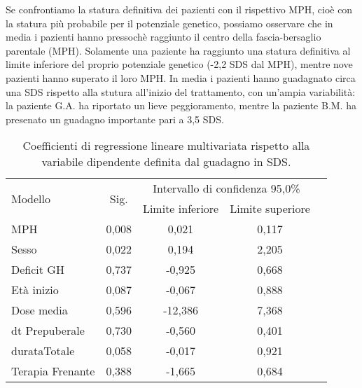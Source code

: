 Se confrontiamo la statura definitiva dei pazienti con il rispettivo MPH, cioè con la statura più probabile per il potenziale genetico, possiamo osservare che in media i pazienti hanno pressochè raggiunto il centro della fascia-bersaglio parentale (MPH). Solamente una paziente ha raggiunto una statura definitiva al limite inferiore del proprio potenziale genetico (-2,2 SDS dal MPH), mentre nove pazienti hanno superato il loro MPH. 
In media i pazienti hanno guadagnato circa una SDS rispetto alla stutura all'inizio del trattamento, con un'ampia variabilità: la paziente G.A. ha riportato un lieve peggioramento, mentre la paziente B.M. ha presenato un guadagno importante pari a 3,5 SDS.
  


\begin{table}[!h]
\begin{center}
\begin{tabular}{l c c c c}
\toprule
\multirow{2}{*}{Modello}& \multirow{2}{*}{Sig.} & \multicolumn{2}{c}{Intervallo di confidenza 95,0\%} \\
			& 	& Limite inferiore & Limite superiore \\
\midrule
MPH			& 0,008	& 0,021	  & 0,117 \\
Sesso			& 0,022	& 0,194	  & 2,205 \\
Deficit GH		& 0,737	& -0,925  & 0,668 \\
Età inizio		& 0,087	& -0,067  & 0,888 \\
Dose media		& 0,596	& -12,386 & 7,368 \\
dt Prepuberale		& 0,730	& -0,560  & 0,401 \\
durataTotale		& 0,058	& -0,017  & 0,921 \\
Terapia Frenante	& 0,388	& -1,665  & 0,684 \\
\bottomrule
\end{tabular} 
\end{center}
\caption{Coefficienti di regressione lineare multivariata rispetto alla variabile dipendente definita dal guadagno in SDS.}
\label{tab:Statistiche}
\end{table}

